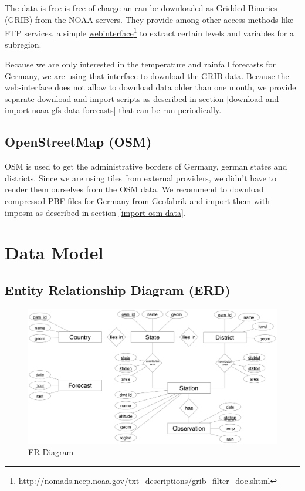 \documentclass[paper=a4, fontsize=11pt]{article} %
\numberwithin{equation}{section} %
\numberwithin{figure}{section} %
\numberwithin{table}{section} %
\begin{document}
The data is free is free of charge an can be downloaded as Gridded Binaries (GRIB)
from the NOAA servers. They provide among other access methods like FTP services,
a simple \href{http://nomads.ncep.noaa.gov/txt_descriptions/grib_filter_doc.shtml}{webinterface}\footnote{http://nomads.ncep.noaa.gov/txt\_descriptions/grib\_filter\_doc.shtml}
to extract certain levels and variables for a subregion.


Because we are only interested in the temperature and rainfall forecasts for
Germany, we are using that interface to download the GRIB data. Because the
web-interface does not allow to download data older than one month, we provide
separate download and import scripts as described in section \ref{download-and-import-noaa-gfs-data-forecasts}
that can be run periodically.

\subsection{OpenStreetMap (OSM)}
OSM is used to get the administrative borders of Germany, german states and districts.
Since we are using tiles from external providers, we didn't have to render them
ourselves from the OSM data. We recommend to download compressed PBF files
for Germany from Geofabrik and import them with imposm as described in section \ref{import-osm-data}.


\section{Data Model}

\subsection{Entity Relationship Diagram (ERD) }
  \begin{figure}[htbp]
  \hspace{-1.35cm}\includegraphics[width=1.25\textwidth]{pictures/er-model}
  \caption{ER-Diagram}
  \end{figure}
\end{document}
